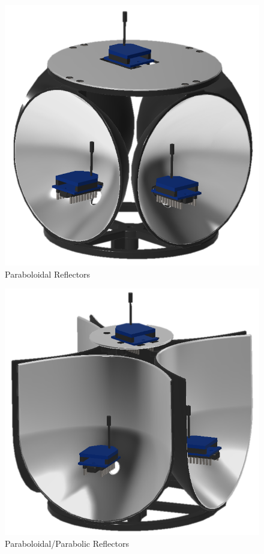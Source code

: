 \documentclass[fontsize=11pt, %
                             paper=letter, %
                             openany, %
                             captions=tableheading,
                             index=totoc,
                             hyperref]{labbook}
\begin{document}
\begin{addmargin}[0cm]{0cm}
\begin{figure}[h!]
    \centering
    \includegraphics[width=4.5in]{figs/img/paraboloidalReflector.png}
    \caption{Paraboloidal Reflectors}
    \label{fig:paraboloidalReflectors}
\end{figure}

\begin{figure}[h!]
    \centering
    \includegraphics[width=4.5in]{figs/img/parabolicReflector.png}
    \caption{Paraboloidal/Parabolic Reflectors}
    \label{fig:paraboloidalParabolicReflectors}
\end{figure}


\end{addmargin}
\end{document}
